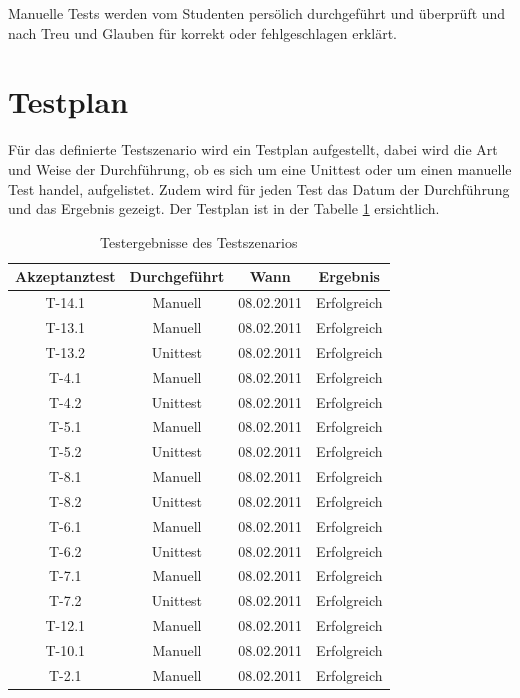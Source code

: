 \documentclass[abstracton, listof=totocnumbered,
bibliography=totocnumbered]{scrreprt}
\begin{document}
  Manuelle Tests werden vom Studenten persölich durchgeführt und überprüft und
  nach Treu und Glauben für korrekt oder fehlgeschlagen erklärt.
  
  \section{Testplan}
  
  Für das definierte Testszenario wird ein Testplan aufgestellt, dabei wird die
  Art und Weise der Durchführung, ob es sich um eine Unittest oder um einen
  manuelle Test handel, aufgelistet. Zudem wird für jeden Test das Datum der
  Durchführung und das Ergebnis gezeigt. Der Testplan ist in der Tabelle
  \ref{tab:testergebnisse} ersichtlich.
  \newline

  \enlargethispage{3cm}

  \begin{table}[h]
    \begin{center}
      \begin{tabular}{cccc}
        \toprule
        Akzeptanztest & Durchgeführt & Wann & Ergebnis \\
        \midrule
        T-14.1 & Manuell & 08.02.2011 & Erfolgreich \\
        T-13.1 & Manuell & 08.02.2011 & Erfolgreich \\
        T-13.2 & Unittest & 08.02.2011 & Erfolgreich \\
        T-4.1 & Manuell & 08.02.2011 & Erfolgreich \\
        T-4.2 & Unittest & 08.02.2011 & Erfolgreich \\
        T-5.1 & Manuell & 08.02.2011 & Erfolgreich \\
        T-5.2 & Unittest & 08.02.2011 & Erfolgreich \\
        T-8.1 & Manuell & 08.02.2011 & Erfolgreich \\
        T-8.2 & Unittest & 08.02.2011 & Erfolgreich \\
        T-6.1 & Manuell & 08.02.2011 & Erfolgreich \\
        T-6.2 & Unittest & 08.02.2011 & Erfolgreich \\
        T-7.1 & Manuell & 08.02.2011 & Erfolgreich \\
        T-7.2 & Unittest & 08.02.2011 & Erfolgreich \\
        T-12.1 & Manuell & 08.02.2011 & Erfolgreich \\
        T-10.1 & Manuell & 08.02.2011 & Erfolgreich \\
        T-2.1 & Manuell & 08.02.2011 & Erfolgreich \\
        \bottomrule
      \end{tabular}
      \caption{Testergebnisse des Testszenarios}
      \label{tab:testergebnisse}
     \end{center}  
  \end{table}
  
\end{document}

